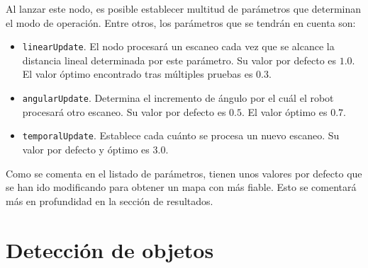 Al lanzar este nodo, es posible establecer multitud de parámetros que determinan el modo de operación. Entre otros, los parámetros que se tendrán en cuenta son:

\begin{itemize}

	\item \texttt{linearUpdate}. El nodo procesará un escaneo cada vez que se alcance la distancia lineal determinada por este parámetro. Su valor por defecto es $1.0$. El valor óptimo encontrado tras múltiples pruebas es $0.3$.
	\item \texttt{angularUpdate}. Determina el incremento de ángulo por el cuál el robot procesará otro escaneo. Su valor por defecto es $0.5$. El valor óptimo es $0.7$.
	\item \texttt{temporalUpdate}. Establece cada cuánto se procesa un nuevo escaneo. Su valor por defecto y óptimo es $3.0$.

\end{itemize}

Como se comenta en el listado de parámetros, tienen unos valores por defecto que se han ido modificando para obtener un mapa con más fiable. Esto se comentará más en profundidad en la sección de resultados.\\

\section{Detección de objetos}





